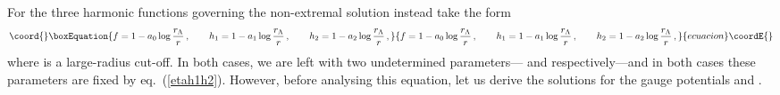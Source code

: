 \documentclass[a4paper,11pt]{article}
\providecommand{\eqref}[1]{(\ref{#1})}
\begin{document}
%
For \coordHE{} the three harmonic functions governing the non-extremal
solution instead take the form
\begin{equation}\coord{}\boxEquation{
\label{theh1h23}
f= 1 - a_0 \log\frac{r_\Lambda}{r} \spa h_1 = 1 - a_1 \log
\frac{r_\Lambda}{r} \spa h_2 = 1 - a_2 \log \frac{r_\Lambda}{r}\,,
}{
f= 1 - a_0 \log\frac{r_\Lambda}{r} \spa h_1 = 1 - a_1 \log
\frac{r_\Lambda}{r} \spa h_2 = 1 - a_2 \log \frac{r_\Lambda}{r}\,,
}{ecuacion}\coordE{}\end{equation}
where \coordHE{} is a large-radius cut-off.  In both cases, we are
left with two undetermined parameters---\coordHE{} and \coordHE{}
respectively---and in both cases these parameters are fixed by
eq.~\eqref{etah1h2}. However, before analysing this equation, let us
derive the solutions for the gauge potentials \coordHE{} and
\coordHE{}.
\end{document}
